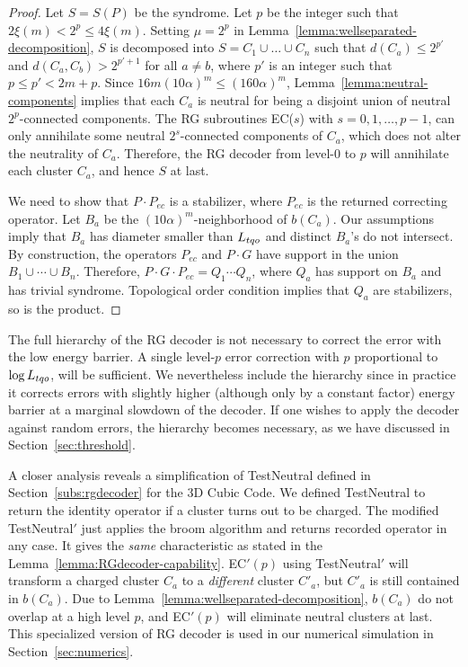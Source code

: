 \begin{proof}
Let $S=S(P)$ be the syndrome.
Let $p$ be the integer such that $2 \xi(m) < 2^p \le 4 \xi(m)$.
Setting $\mu=2^p$ in Lemma~\ref{lemma:wellseparated-decomposition},
$S$ is decomposed into $S=C_1 \cup \ldots \cup C_n$
such that $d(C_a) \le 2^{p'}$ and $ d(C_a,C_b) > 2^{p'+1}$ for all $a \ne b$,
where $p'$ is an integer such that $p \le p' < 2m+p$.
Since $16m(10\alpha)^m \le (160\alpha)^m$,
Lemma~\ref{lemma:neutral-components} implies that
each $C_a$ is neutral for being a disjoint union of neutral $2^p$-connected components.
The RG subroutines EC($s$) with $s=0,1,\ldots,p-1$,
can only annihilate some neutral $2^s$-connected components of $C_a$,
which does not alter the neutrality of $C_a$.
Therefore, the RG decoder from level-$0$ to $p$
will annihilate each cluster $C_a$, and hence $S$ at last.

We need to show that $P \cdot P_{ec}$ is a stabilizer,
where $P_{ec}$ is the returned correcting operator.
Let $B_a$ be the $(10\alpha)^m$-neighborhood of $b(C_a)$.
Our assumptions imply that $B_a$ has diameter smaller than ${L_{tqo}}$
and distinct $B_a$'s do not intersect.
By construction, the operators $P_{ec}$ and $P \cdot G$
have support in the union $B_1 \cup \cdots \cup B_n$.
Therefore, $P \cdot G \cdot P_{ec} = Q_1 \cdots Q_n$,
where $Q_a$ has support on $B_a$ and has trivial syndrome.
Topological order condition implies that $Q_a$ are stabilizers, so is the product.
\end{proof}

The full hierarchy of the RG decoder
is not necessary to correct the error with the low energy barrier.
A single level-$p$ error correction with $p$ proportional to $\log {L_{tqo}}$, will be sufficient.
We nevertheless include the hierarchy
since in practice it corrects errors with slightly higher
(although only by a constant factor) energy barrier
at a marginal slowdown of the decoder.
If one wishes to apply the decoder against random errors,
the hierarchy becomes necessary,
as we have discussed in Section~\ref{sec:threshold}.

\begin{rem}
\label{rem:TestNeutralprime}
A closer analysis reveals a simplification of TestNeutral defined in Section~\ref{subs:rgdecoder} for the 3D Cubic Code.
We defined TestNeutral to return the identity operator if a cluster turns out to be charged.
The modified TestNeutral$'$ just applies the broom algorithm and returns recorded operator in any case.
It gives the {\em same} characteristic as stated in the Lemma~\ref{lemma:RGdecoder-capability}.
EC$'(p)$ using TestNeutral$'$ will transform a charged cluster $C_a$ to a {\em different} cluster $C'_a$,
but $C'_a$ is still contained in $b(C_a)$.
Due to Lemma~\ref{lemma:wellseparated-decomposition}, $b(C_a)$ do not overlap
at a high level $p$, and EC$'(p)$ will eliminate neutral clusters at last.
This specialized version of RG decoder is used in our numerical simulation 
in Section~\ref{sec:numerics}.
\end{rem}


